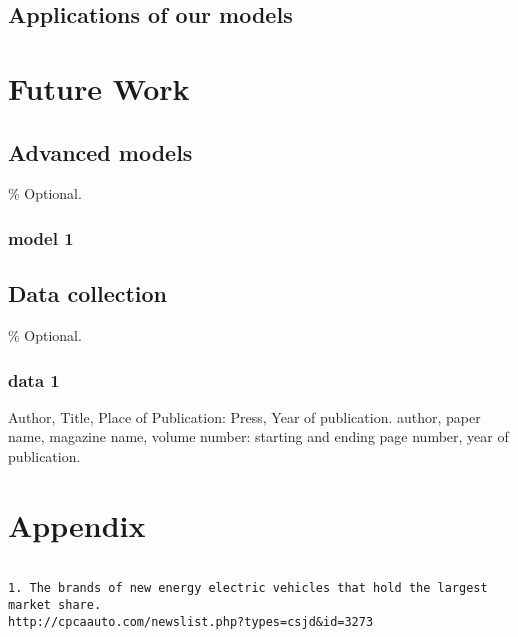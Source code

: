 \documentclass{apmcmthesis}
\begin{document}
\subsection{Applications of our models}




\section{Future Work}

\subsection{Advanced models}
\% Optional.

\subsubsection{model 1}

\subsection{Data collection}
\% Optional.

\subsubsection{data 1}




\begin{thebibliography}{9}%
 Author, Title, Place of Publication: Press, Year of publication.
 author, paper name, magazine name, volume number: starting and ending
page number, year of publication.

\end{thebibliography}

\newpage

\section{Appendix}

\begin{lstlisting}[caption={Data source}]

1. The brands of new energy electric vehicles that hold the largest market share.
http://cpcaauto.com/newslist.php?types=csjd&id=3273

\end{lstlisting}
\end{document}
